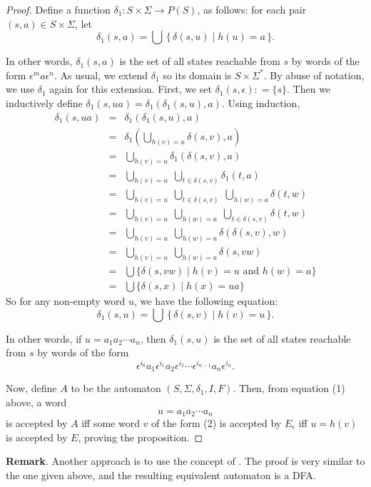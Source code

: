 \documentclass[12pt]{article}
\begin{document}
\begin{proof}  Define a function $\delta_1: S\times \Sigma\to P(S)$, as follows: for each pair $(s,a)\in S\times \Sigma$, let $$\delta_1(s,a)= \bigcup \, \lbrace \, \delta(s,u)\mid h(u)=a \, \rbrace.$$

In other words, $\delta_1(s,a)$ is the set of all states reachable from $s$ by words of the form $\epsilon^m a\epsilon^n$.  As usual, we extend $\delta_1$ so its domain is $S\times \Sigma^*$.  By abuse of notation, we use $\delta_1$ again for this extension.  First, we set $\delta_1(s,\epsilon): = \lbrace s\rbrace$.  Then we inductively define $\delta_1(s,ua)= \delta_1(\delta_1(s,u),a)$.  Using induction, 
\begin{eqnarray*}
\delta_1(s,ua) &=& \delta_1(\delta_1(s,u),a) \\ 
&=& \delta_1(\bigcup_{h(v)=u} \delta(s,v),a) \\
&=& \bigcup_{h(v)=u} \delta_1(\delta(s,v),a) \\
&=& \bigcup_{h(v)=u} \; \bigcup_{t\in \delta(s,v)} \delta_1(t,a) \\
&=& \bigcup_{h(v)=u} \; \bigcup_{t\in \delta(s,v)} \; \bigcup_{h(w)=a} \delta(t,w) \\
&=& \bigcup_{h(v)=u} \; \bigcup_{h(w)=a} \; \bigcup_{t\in \delta(s,v)} \delta(t,w) \\
&=& \bigcup_{h(v)=u} \; \bigcup_{h(w)=a} \delta(\delta(s,v),w) \\
&=& \bigcup_{h(v)=u} \; \bigcup_{h(w)=a} \delta(s,vw) \\
&=& \bigcup \lbrace \delta(s,vw) \mid h(v)=u \mbox{ and } h(w)=a \rbrace \\
&=& \bigcup \lbrace \delta(s,x) \mid h(x)=ua \rbrace
\end{eqnarray*}
So for any non-empty word $u$, we have the following equation:
\begin{equation}
\delta_1(s,u) = \bigcup \, \lbrace \, \delta(s,v)\mid h(v)=u \, \rbrace.
\end{equation}

In other words, if $u=a_1a_2\cdots a_n$, then $\delta_1(s,u)$ is the set of all states reachable from $s$ by words of the form 
\begin{equation}
\epsilon^{i_0}a_1\epsilon^{i_1}a_2 \epsilon^{i_2}\cdots \epsilon^{i_{n-1}}a_n \epsilon^{i_n}.
\end{equation}

Now, define $A$ to be the automaton $(S,\Sigma,\delta_1,I,F)$.  Then, from equation (1) above, a word $$u=a_1 a_2\cdots a_n$$ is accepted by $A$ iff some word $v$ of the form (2) is accepted by $E_{\epsilon}$ iff $u=h(v)$ is accepted by $E$, proving the proposition.
\end{proof}

\textbf{Remark}.  Another approach is to use the concept of .  The proof is very similar to the one given above, and the resulting equivalent automaton is a DFA.
\end{document}
